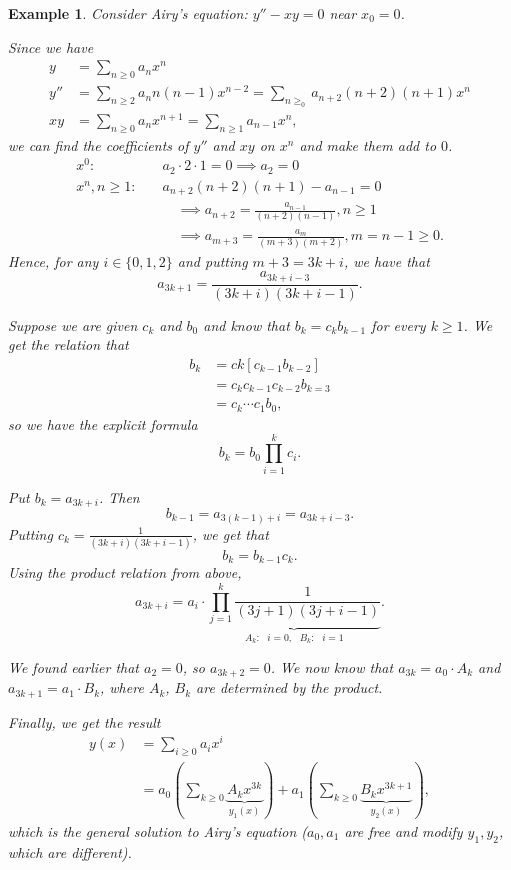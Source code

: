 \documentclass{tufte-handout}
\newtheorem{ex}[thm]{Example}
\theoremstyle{definition}
\begin{document}
\begin{ex}
	Consider Airy's equation: $y'' - xy = 0$ near $x_0 = 0$. 

	Since we have 
	\begin{align*}
		y &= \sum\limits_{n \ge 0}^{} a_n x^n \\ 
	y'' &= \sum\limits_{n \ge 2}^{} a_n n (n-1)x^{n-2} = \sum\limits_{n\ge_0}^{} a_{n+2} (n+2)(n+1)x^{n} \\
		xy &= \sum\limits_{n \ge 0}^{} a_n x^{n+1} = \sum\limits_{n\ge 1}^{} a_{n-1} x^{n}
	,\end{align*}
	we can find the coefficients of $y''$ and $xy$ on $x^{n}$ and make them add to $0$.
	\begin{align*}
		x^{0}:& \quad a_2 \cdot 2 \cdot 1 = 0 \implies a_2 = 0 \\
		x^{n}, n \ge 1:& \quad  a_{n+2}(n+2)(n+1) - a_{n-1} = 0 \\ 
					   & \qquad \implies a_{n+2} = \frac{a_{n-1}}{\left( n+2 \right)\left( n-1 \right)}, n \ge 1 \\
					   &\qquad \implies a_{m+3} = \frac{a_m}{(m+3)(m+2)}, m = n- 1 \ge 0
	.\end{align*}
	Hence, for any $i \in \{0,1,2\}$ and putting $m+ 3 = 3k + i$, we have that \[
		a_{3k + 1} = \frac{a_{3k + i - 3}}{\left( 3k+i \right)\left( 3k+i-1 \right)}
	.\] 

	Suppose we are given $c_k$ and $b_0$ and know that $b_k = c_k b_{k-1}$ for every $k \ge 1$. We get the relation that 
	\begin{align*}
		b_k &= ck \left[ c_{k-1} b_{k-2} \right]  \\
		&= c_k c_{k-1} c_{k-2} b_{k=3} \\
		&= c_k \cdots c_1b_0
	,\end{align*}
	so we have the explicit formula \[
		b_k = b_0 \prod_{i=1}^{k} c_i 
	.\] 

	Put $b_k = a_{3k + i}$. Then \[
		b_{k-1} = a_{3(k-1)+i} = a_{3k+ i -3}
	.\] Putting $c_k = \frac{1}{\left( 3k+i \right)\left( 3k+i-1 \right)}$, we get that \[
		b_k = b_{k-1} c_k
	.\] Using the product relation from above, \[
	a_{3k+i} = a_i \cdot \underbrace{\prod_{j=1}^{k} \frac{1}{\left( 3j+1 \right)\left( 3j+i-1 \right)}}_{A_k: \text{ }i = 0, \text{ }B_k: \text{ } i = 1} 
	.\] 

	We found earlier that $a_2 = 0$, so $a_{3k + 2} = 0$. We now know that $a_{3k} = a_0 \cdot A_k$ and $a_{3k + 1} = a_1 \cdot B_k$, where $A_k$, $B_k$ are determined by the product.

	Finally, we get the result
	\begin{align*}
		y(x) &= \sum\limits_{i \ge 0}^{} a_i x^i  \\
			 &= a_0 \left( \sum\limits_{k \ge 0}^{} \underbrace{A_k x^{3k}}_{y_1(x)} \right) + a_1\left( \sum\limits_{k\ge 0}^{} \underbrace{B_k x^{3k+1}}_{y_2(x)} \right),
	\end{align*}
	which is the general solution to Airy's equation ($a_0, a_1$ are free and modify $y_1,y_2$, which are different).


\end{ex}
\end{document}
